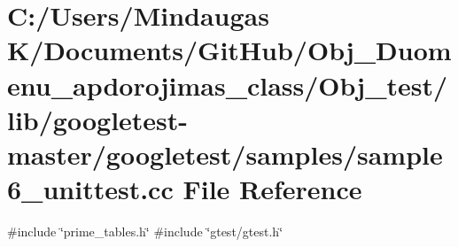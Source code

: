\hypertarget{_obj__test_2lib_2googletest-master_2googletest_2samples_2sample6__unittest_8cc}{}\section{C\+:/\+Users/\+Mindaugas K/\+Documents/\+Git\+Hub/\+Obj\+\_\+\+Duomenu\+\_\+apdorojimas\+\_\+class/\+Obj\+\_\+test/lib/googletest-\/master/googletest/samples/sample6\+\_\+unittest.cc File Reference}
\label{_obj__test_2lib_2googletest-master_2googletest_2samples_2sample6__unittest_8cc}
{\ttfamily \#include \char`\"{}prime\+\_\+tables.\+h\char`\"{}}\newline
{\ttfamily \#include \char`\"{}gtest/gtest.\+h\char`\"{}}\newline
